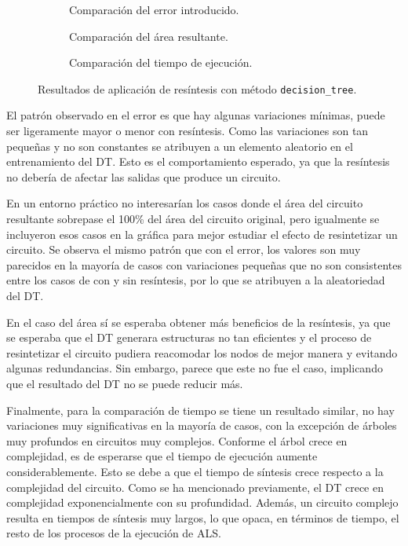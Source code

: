 \begin{figure}
  \centering
  \begin{subfigure}{0.95\textwidth}
    \centering
    
    \caption{Comparación del error introducido.}
    \label{fig:resynth_mred}
  \end{subfigure}
  \begin{subfigure}{0.95\textwidth}
    \centering
    
    \caption{Comparación del área resultante.}
    \label{fig:resynth_area}
  \end{subfigure}
  \begin{subfigure}{0.95\textwidth}
    \centering
    
    \caption{Comparación del tiempo de ejecución.}
    \label{fig:resynth_time}
  \end{subfigure}
  \caption{Resultados de aplicación de resíntesis con método \texttt{decision\_tree}.}
  \label{fig:resynth}
\end{figure}

El patrón observado en el error
es que hay algunas variaciones mínimas, puede ser ligeramente mayor
o menor con resíntesis. Como las variaciones son tan pequeñas y no son
constantes se atribuyen a un elemento aleatorio en el entrenamiento del DT.
Esto es el comportamiento esperado, ya que la resíntesis no debería de afectar
las salidas que produce un circuito.

En un entorno práctico no interesarían los casos donde el área del circuito
resultante sobrepase el 100\% del área del circuito original, pero igualmente
se incluyeron esos casos en la gráfica para mejor estudiar el efecto de
resintetizar un circuito. Se observa el mismo patrón que con el error, los
valores son muy parecidos en la mayoría de casos con variaciones pequeñas que
no son consistentes entre los casos de con y sin resíntesis, por lo que se
atribuyen a la aleatoriedad del DT.

En el caso del área sí se esperaba obtener más
beneficios de la resíntesis, ya que se esperaba que el DT generara estructuras
no tan eficientes y el proceso de resintetizar el circuito pudiera reacomodar
los nodos de mejor manera y evitando algunas redundancias. Sin embargo, parece
que este no fue el caso, implicando que el resultado del DT no se puede reducir
más.

Finalmente, para la comparación de tiempo se tiene un resultado similar, no hay
variaciones muy significativas en la mayoría de casos, con la excepción de
árboles muy profundos en circuitos muy complejos. Conforme el árbol crece en
complejidad, es de esperarse que el tiempo de ejecución aumente
considerablemente. Esto se debe a que el tiempo de síntesis crece respecto a la
complejidad del circuito. Como se ha mencionado previamente, el DT crece en
complejidad exponencialmente con su profundidad. Además, un circuito complejo
resulta en tiempos de síntesis muy largos, lo que opaca, en términos de tiempo,
el resto de los procesos de la ejecución de ALS.

